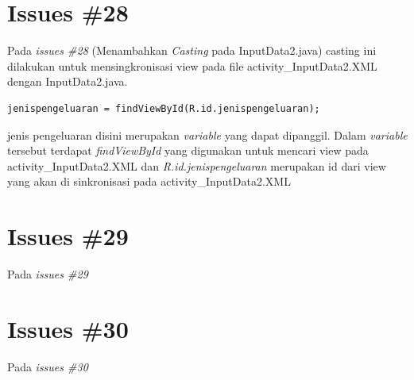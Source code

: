 \section{Issues \#28}
Pada \textit{issues \#28} (Menambahkan \textit{Casting} pada InputData2.java) casting ini dilakukan untuk mensingkronisasi view pada file activity_InputData2.XML dengan InputData2.java.
\begin{verbatim}
jenispengeluaran = findViewById(R.id.jenispengeluaran);
\end{verbatim}
jenis pengeluaran disini merupakan \textit{variable} yang dapat dipanggil. Dalam \textit{variable} tersebut terdapat \textit{findViewById} yang digunakan untuk mencari view pada activity_InputData2.XML dan \textit{R.id.jenispengeluaran} merupakan id dari view yang akan di sinkronisasi pada activity_InputData2.XML


\section{Issues \#29}
Pada \textit{issues \#29}

\section{Issues \#30}
Pada \textit{issues \#30}